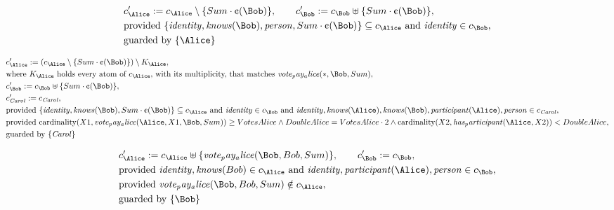 \begin{align*}
&
c'_
{
\Alice
}
 := 
c_
{
\Alice
}
 \setminus 
\{
Sum
\cdot
\text{\textcent}
(
\Bob
)
\}
, \qquad 
c'_
{
\Bob
}
 := 
c_
{
\Bob
}
 \uplus 
\{
Sum
\cdot
\text{\textcent}
(
\Bob
)
\}
,\\
&
\text{provided } 
\{
\mathit{
identity
}
,
\mathit{
knows
}
(
\Bob
)
,
\mathit{
person
}
,
Sum
\cdot
\text{\textcent}
(
\Bob
)
\}
 \subseteq c_
{
\Alice
}
 \text{ and } 
\mathit{
identity
}
 \in c_
{
\Bob
}
,\\
&
\text{guarded by } \{
\Alice
\}
\end{align*}

\begin{align*}
&
c'_
{
\Alice
}
 := 
(c_
{
\Alice
}
 \setminus 
\{
Sum
\cdot
\text{\textcent}
(
\Bob
)
\}
) \setminus K_
{
\Alice
}
,\\
&
\text{where } K_
{
\Alice
}
 \text{ holds every atom of } c_
{
\Alice
}
 \text{, with its multiplicity, that matches } 
\mathit{
vote_pay_alice
}
(
\ast
,
\Bob
,
Sum
)
,\\
&
c'_
{
\Bob
}
 := 
c_
{
\Bob
}
 \uplus 
\{
Sum
\cdot
\text{\textcent}
(
\Bob
)
\}
,\\
&
c'_
{
\mathit{Carol}
}
 := 
c_
{
\mathit{Carol}
}
,\\
&
\text{provided } 
\{
\mathit{
identity
}
,
\mathit{
knows
}
(
\Bob
)
,
Sum
\cdot
\text{\textcent}
(
\Bob
)
\}
 \subseteq c_
{
\Alice
}
 \text{ and } 
\mathit{
identity
}
 \in c_
{
\Bob
}
 \text{ and } 
\mathit{
identity
}
,
\mathit{
knows
}
(
\Alice
)
,
\mathit{
knows
}
(
\Bob
)
,
\mathit{
participant
}
(
\Alice
)
,
\mathit{
person
}
 \in c_
{
\mathit{Carol}
}
,\\
&
\text{provided } 
\mathrm{cardinality}(
X1
,
\mathit{
vote_pay_alice
}
(
\Alice
,
X1
,
\Bob
,
Sum
)
)
\ge
VotesAlice
\land
DoubleAlice
=
VotesAlice
\cdot
2
\land
\mathrm{cardinality}(
X2
,
\mathit{
has_participant
}
(
\Alice
,
X2
)
)
<
DoubleAlice
,\\
&
\text{guarded by } \{
\mathit{Carol}
\}
\end{align*}

\begin{align*}
&
c'_
{
\Alice
}
 := 
c_
{
\Alice
}
 \uplus 
\{
\mathit{
vote_pay_alice
}
(
\Bob
,
Bob
,
Sum
)
\}
, \qquad 
c'_
{
\Bob
}
 := 
c_
{
\Bob
}
,\\
&
\text{provided } 
\mathit{
identity
}
,
\mathit{
knows
}
(
Bob
)
 \in c_
{
\Alice
}
 \text{ and } 
\mathit{
identity
}
,
\mathit{
participant
}
(
\Alice
)
,
\mathit{
person
}
 \in c_
{
\Bob
}
,\\
&
\text{provided } 
\mathit{
vote_pay_alice
}
(
\Bob
,
Bob
,
Sum
)
 \notin c_
{
\Alice
}
,\\
&
\text{guarded by } \{
\Bob
\}
\end{align*}

